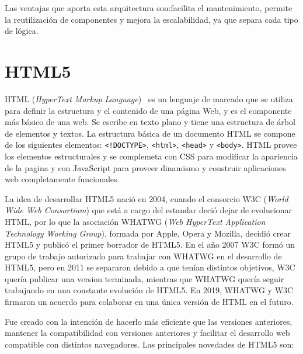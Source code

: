 \documentclass[a4paper, 12pt]{book}
\begin{document}
Las ventajas que aporta esta arquitectura son:facilita el mantenimiento, permite la reutilización de componentes y mejora la escalabilidad, ya que separa cada tipo de lógica.


\section{HTML5} 
\label{sec:HTML5}

HTML (\emph{HyperText Markup Language})~\cite{Pagina_HTML, Historia_HTML5, gauchat2012gran} es un lenguaje de marcado que se utiliza para definir la estructura y el contenido de una página Web, y es el componente más básico de una web. Se escribe en texto plano y tiene una estructura de árbol de elementos y textos. La estructura básica de un documento HTML se compone de los siguientes elementos: \texttt{<!DOCTYPE>}, \texttt{<html>}, \texttt{<head>} y \texttt{<body>}. HTML provee los elementos estructurales y se complemeta con CSS para modificar la apariencia de la pagina y con JavaScript para proveer dinamismo y construir aplicaciones web completamente funcionales. 

La idea de desarrollar HTML5 nació en 2004, cuando el consorcio W3C (\emph{World Wide Web Consortium})  que está a cargo del estandar deció dejar de evolucionar HTML, por lo que la asociación WHATWG (\emph{Web HyperText Application Technology Working Group}), formada por Apple, Opera y Mozilla, decidió crear HTML5 y publicó el primer borrador de HTML5. En el año 2007 W3C formó un grupo de trabajo autorizado para trabajar con WHATWG en el desarrollo de HTML5, pero en 2011 se separaron debido a que tenían distintos objetivos, W3C quería publicar una version terminada, mientras que WHATWG quería seguir trabajando en una constante evolución de HTML5. En 2019, WHATWG y W3C firmaron un acuerdo para colaborar en una única versión de HTML en el futuro.

Fue creado con la intención de hacerlo más eficiente que las versiones anteriores, mantener la compatibilidad con versiones anteriores y facilitar el desarrollo web compatible con distintos navegadores. Las principales novedades de HTML5 son:
\end{document}
